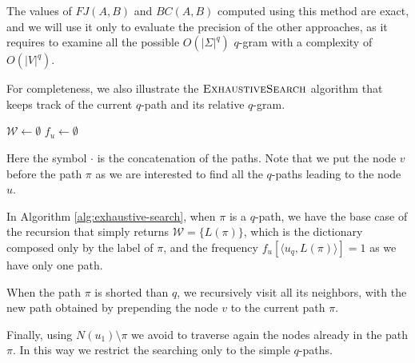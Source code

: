 The values of $FJ(A,B)$ and $BC(A,B)$ computed using this method are exact, and we will use it only to evaluate the precision of the other approaches, as it requires to examine all the possible $O(|\Sigma|^{q})$ $q$-gram with a complexity of $O(|V|^{q})$.\medskip
	
For completeness, we also illustrate the $\textsc{ExhaustiveSearch}$ algorithm that keeps track of the current $q$-path and its relative $q$-gram.
	
\begin{algorithm}[h]
	\small
	\DontPrintSemicolon
	\BlankLine
	$\mathcal{W} \gets \emptyset$\;
	$f_{u} \gets \emptyset$ \quad \;    
	\BlankLine
	\BlankLine
	\caption{$\textsc{ExhaustiveSearch}$}
	\label{alg:exhaustive-search}
\end{algorithm}

Here the symbol $\cdot$ is the concatenation of the paths. Note that we put the node $v$ before the path $\pi$ as we are interested to find all the $q$-paths leading to the node $u$.\medskip
	
In Algorithm \ref{alg:exhaustive-search}, when $\pi$ is a $q$-path, we have the base case of the recursion that simply returns $\mathcal{W} = \{ L(\pi) \}$, which is the dictionary composed only by the label of $\pi$, and the frequency $f_{u}[\langle u_{q}, L(\pi) \rangle] = 1$ as we have only one path.
	
When the path $\pi$ is shorted than $q$, we recursively visit all its neighbors, with the new path obtained by prepending the node $v$ to the current path $\pi$.\medskip
	
\clearpage
	
Finally, using $N(u_{1}) \setminus \pi$ we avoid to traverse again the nodes already in the path $\pi$. In this way we restrict the searching only to the simple $q$-paths.
	

